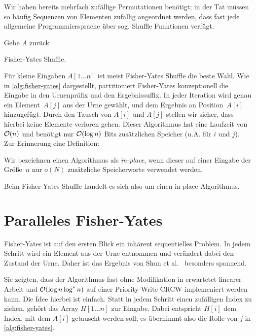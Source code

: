 Wir haben bereits mehrfach zufällige Permutationen benötigt;
in der Tat müssen so häufig Sequenzen von Elementen zufällig angeordnet werden, dass fast jede allgemeine Programmiersprache über sog. Shuffle Funktionen verfügt.

\begin{algorithm}
    Gebe $A$ zurück
    \caption{Fisher-Yates Shuffle.}
    \label{alg:fisher-yates}
\end{algorithm}

Für kleine Eingaben $A[1 \ldots n]$ ist meist Fisher-Yates Shuffle die beste Wahl.
Wie in \cref{alg:fisher-yates} dargestellt, partitioniert Fisher-Yates konzeptionell die Eingabe in den Urnenpräfix und den Ergebnissuffix.
In jeder Iteration wird genau ein Element~$A[j]$ aus der Urne gewählt, und dem Ergebnis an Position~$A[i]$ hinzugefügt.
Durch den Tausch von $A[i]$ und $A[j]$ stellen wir sicher, dass hierbei keine Elemente verloren gehen.
Dieser Algorithmus hat eine Laufzeit von $\mathcal{O}\!\left(n\right)$ und benötigt nur $\mathcal{O}\!\left(\log n\right)$ Bits zusätzlichen Speicher (u.A. für $i$ und $j$).
Zur Erinnerung eine Definition:

\begin{definition}
    Wir bezeichnen einen Algorithmus als \emph{in-place}, wenn dieser auf einer Eingabe der Größe~$n$ nur $o(N)$ zusätzliche Speicherworte verwendet werden.
\end{definition}

Beim Fisher-Yates Shuffle handelt es sich also um einen in-place Algorithmus.

\section{Paralleles Fisher-Yates}
Fisher-Yates ist auf den ersten Blick ein inhärent sequentielles Problem.
In jedem Schritt wird ein Element aus der Urne entnommen und verändert dabei den Zustand der Urne.
Daher ist das Ergebnis von Shun et al.~\cite{DBLP:conf/soda/ShunGBFG15} besonders spannend.

Sie zeigten, dass der Algorithmus fast ohne Modifikation in erwartetet linearer Arbeit und $\mathcal{O}\!\left(\log n \log^* n\right)$ auf einer Priority-Write CRCW implemeniert werden kann.
Die Idee hierbei ist einfach.
Statt in jedem Schritt einen zufälligen Index zu ziehen, gehört das Array $H[1 \ldots n]$ zur Eingabe.
Dabei entspricht $H[i]$ dem Index, mit dem $A[i]$ getauscht werden soll; es übernimmt also die Rolle von $j$ in \cref{alg:fisher-yates}.


